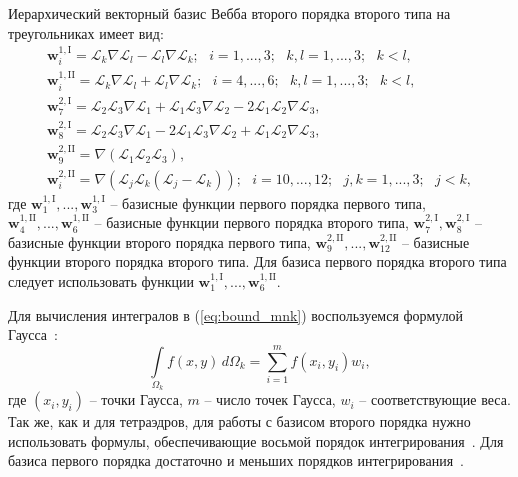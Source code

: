 \documentclass[a4paper,14pt]{article}
\begin{document}
Иерархический векторный базис Вебба второго порядка второго типа на треугольниках имеет вид:
\begin{equation*}
	\begin{matrix}
		\displaystyle
		\mathbf{w}_{i}^{1,\mathrm{I}} = \mathcal{L}_k \nabla \mathcal{L}_l - \mathcal{L}_l \nabla \mathcal{L}_k ;
		\scriptstyle
		\text{~~} i = 1, ..., 3 ; \text{~~} k, l = 1, ..., 3 ; \text{~~} k < l ,\\
		\displaystyle
		\mathbf{w}_{i}^{1,\mathrm{II}} = \mathcal{L}_k \nabla \mathcal{L}_l + \mathcal{L}_l \nabla \mathcal{L}_k ;
		\scriptstyle
		\text{~~} i = 4, ..., 6 ; \text{~~} k, l = 1, ..., 3 ; \text{~~} k < l ,\\
		\displaystyle
		\mathbf{w}_{7}^{2,\mathrm{I}} = \mathcal{L}_2 \mathcal{L}_3 \nabla \mathcal{L}_1 + \mathcal{L}_1 \mathcal{L}_3 \nabla \mathcal{L}_2 - 2 \mathcal{L}_1 \mathcal{L}_2 \nabla \mathcal{L}_3 ,\\
		\displaystyle
		\mathbf{w}_{8}^{2,\mathrm{I}} = \mathcal{L}_2 \mathcal{L}_3 \nabla \mathcal{L}_1 - 2 \mathcal{L}_1 \mathcal{L}_3 \nabla \mathcal{L}_2 + \mathcal{L}_1 \mathcal{L}_2 \nabla \mathcal{L}_3 ,\\
		\displaystyle
		\mathbf{w}_{9}^{2,\mathrm{II}} = \nabla ( \mathcal{L}_1 \mathcal{L}_2 \mathcal{L}_3 ) ,\\
		\displaystyle
		\mathbf{w}_{i}^{2,\mathrm{II}} = \nabla ( \mathcal{L}_j \mathcal{L}_k ( \mathcal{L}_j - \mathcal{L}_k ) ) ;
		\scriptstyle
		\text{~~} i = 10, ..., 12 ; \text{~~} j, k = 1, ..., 3 ; \text{~~} j < k ,
	\end{matrix}
	\label{eq:tr_basis}
\end{equation*}
где $\mathbf{w}_{1}^{1,\mathrm{I}}, ..., \mathbf{w}_{3}^{1,\mathrm{I}}$ -- базисные функции первого порядка первого типа, $\mathbf{w}_{4}^{1,\mathrm{II}}, ..., \mathbf{w}_{6}^{1,\mathrm{II}}$ -- базисные функции первого порядка второго типа, $\mathbf{w}_{7}^{2,\mathrm{I}}, \mathbf{w}_{8}^{2,\mathrm{I}}$ -- базисные функции второго порядка первого типа, $\mathbf{w}_{9}^{2,\mathrm{II}}, ..., \mathbf{w}_{12}^{2,\mathrm{II}}$ -- базисные функции второго порядка второго типа. Для базиса первого порядка второго типа следует использовать функции $\mathbf{w}_{1}^{1,\mathrm{I}}, ..., \mathbf{w}_{6}^{1,\mathrm{II}}$.

Для вычисления интегралов в (\ref{eq:bound_mnk}) воспользуемся формулой Гаусса~\citep{misovskih}:
\begin{equation*}
	\int\limits_{\Omega_k} f(x, y) \,d\Omega_k = \sum\limits_{i = 1}^m f( x_i , y_i) w_i ,
\end{equation*}
где $(x_i , y_i)$ -- точки Гаусса, $m$ -- число точек Гаусса, $w_i$ -- соответствующие веса. Так же, как и для тетраэдров, для работы с базисом второго порядка нужно использовать формулы, обеспечивающие восьмой порядок интегрирования~\citep{zhang_integration}. Для базиса первого порядка достаточно и меньших порядков интегрирования~\citep{tr_integration, misovskih}.
\end{document}
